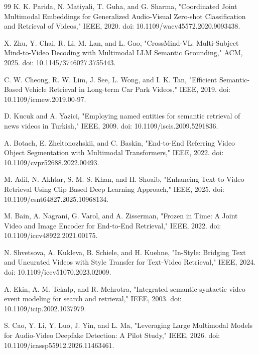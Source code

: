 \documentclass[conference]{IEEEtran}
\begin{document}
\begin{thebibliography}{99}
K. K. Parida, N. Matiyali, T. Guha, and G. Sharma, "Coordinated Joint Multimodal Embeddings for Generalized Audio-Visual Zero-shot Classification and Retrieval of Videos," IEEE, 2020. doi: 10.1109/wacv45572.2020.9093438.

X. Zhu, Y. Chai, R. Li, M. Lan, and L. Gao, "CrossMind-VL: Multi-Subject Mind-to-Video Decoding with Multimodal LLM Semantic Grounding," ACM, 2025. doi: 10.1145/3746027.3755443.

C. W. Cheong, R. W. Lim, J. See, L. Wong, and I. K. Tan, "Efficient Semantic-Based Vehicle Retrieval in Long-term Car Park Videos," IEEE, 2019. doi: 10.1109/icmew.2019.00-97.

D. Kucuk and A. Yazici, "Employing named entities for semantic retrieval of news videos in Turkish," IEEE, 2009. doi: 10.1109/iscis.2009.5291836.

A. Botach, E. Zheltonozhskii, and C. Baskin, "End-to-End Referring Video Object Segmentation with Multimodal Transformers," IEEE, 2022. doi: 10.1109/cvpr52688.2022.00493.

M. Adil, N. Akhtar, S. M. S. Khan, and H. Shoaib, "Enhancing Text-to-Video Retrieval Using Clip Based Deep Learning Approach," IEEE, 2025. doi: 10.1109/csnt64827.2025.10968134.

M. Bain, A. Nagrani, G. Varol, and A. Zisserman, "Frozen in Time: A Joint Video and Image Encoder for End-to-End Retrieval," IEEE, 2022. doi: 10.1109/iccv48922.2021.00175.

N. Shvetsova, A. Kukleva, B. Schiele, and H. Kuehne, "In-Style: Bridging Text and Uncurated Videos with Style Transfer for Text-Video Retrieval," IEEE, 2024. doi: 10.1109/iccv51070.2023.02009.

A. Ekin, A. M. Tekalp, and R. Mehrotra, "Integrated semantic-syntactic video event modeling for search and retrieval," IEEE, 2003. doi: 10.1109/icip.2002.1037979.

S. Cao, Y. Li, Y. Luo, J. Yin, and L. Ma, "Leveraging Large Multimodal Models for Audio-Video Deepfake Detection: A Pilot Study," IEEE, 2026. doi: 10.1109/icassp55912.2026.11463461.
\end{thebibliography}
\end{document}
